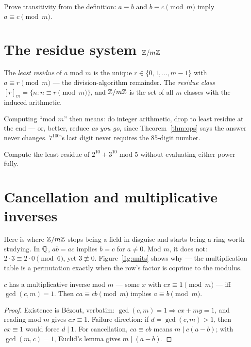 \begin{exercise}[easy]\label{exr:congdef}
Prove transitivity from the definition: $a \equiv b$ and $b \equiv c
\pmod m$ imply $a \equiv c \pmod m$.
\end{exercise}

\section{The residue system $\mathbb{Z}/m\mathbb{Z}$}\label{sec:zm}

\begin{definition}
The \emph{least residue} of $a$ mod $m$ is the unique $r \in
\{0,1,\dots,m-1\}$ with $a \equiv r \pmod m$ --- the division-algorithm
remainder. The \emph{residue class} $[r]_m = \{n : n \equiv r \pmod m\}$,
and $\mathbb{Z}/m\mathbb{Z}$ is the set of all $m$ classes with the induced arithmetic.
\end{definition}

Computing ``mod $m$'' then means: do integer arithmetic, drop to least
residue at the end --- or, better, reduce \emph{as you go}, since
Theorem~\ref{thm:ops} says the answer never changes. $7^{100}$'s last digit
never requires the 85-digit number.

\begin{exercise}[easy]\label{exr:reduce}
Compute the least residue of $2^{10} + 3^{10}$ mod $5$ without evaluating
either power fully.
\end{exercise}

\section{Cancellation and multiplicative inverses}\label{sec:cancel}

Here is where $\mathbb{Z}/m\mathbb{Z}$ stops being a field in disguise and starts being a
ring worth studying. In $\mathbb{Q}$, $ab = ac$ implies $b = c$ for $a \ne 0$. Mod
$m$, it does not: $2 \cdot 3 \equiv 2 \cdot 0 \pmod 6$, yet $3 \not\equiv
0$. Figure~\ref{fig:units} shows why --- the multiplication table is a
permutation exactly when the row's factor is coprime to the modulus.

\begin{theorem}\label{thm:cancel}
$c$ has a multiplicative inverse mod $m$ --- some $x$ with $cx \equiv 1
\pmod m$ --- iff $\gcd(c, m) = 1$. Then $ca \equiv cb \pmod m$ implies
$a \equiv b \pmod m$.
\end{theorem}

\begin{proof}
Existence is B\'ezout, verbatim: $\gcd(c,m)=1 \Rightarrow cx + my = 1$, and
reading mod $m$ gives $cx \equiv 1$. Failure direction: if $d = \gcd(c,m)
> 1$, then $cx \equiv 1$ would force $d \mid 1$. For cancellation,
$ca \equiv cb$ means $m \mid c(a-b)$; with $\gcd(m,c)=1$, Euclid's lemma
gives $m \mid (a-b)$.
\end{proof}

